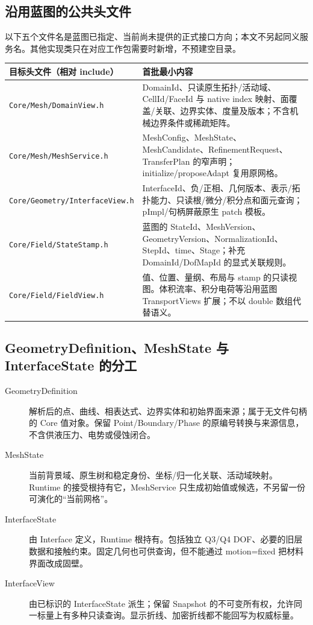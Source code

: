 \documentclass[UTF8,a4paper,11pt,fontset=fandol]{ctexart}
\newcommand{\code}[1]{\nolinkurl{#1}}
\begin{document}
\subsection{沿用蓝图的公共头文件}
以下五个文件名是蓝图已指定、当前尚未提供的正式接口方向；本文不另起同义服务名。其他实现类只在对应工作包需要时新增，不预建空目录。
\begin{longtable}{@{}P{.37\textwidth}P{.57\textwidth}@{}}
\toprule 目标头文件（相对 include） & 首批最小内容\\\midrule\endhead
\code{Core/Mesh/DomainView.h} & DomainId、只读原生拓扑/活动域、CellId/FaceId 与 native index 映射、面覆盖/关联、边界实体、度量及版本；不含机械边界条件或稀疏矩阵。\\
\code{Core/Mesh/MeshService.h} & MeshConfig、MeshState、MeshCandidate、RefinementRequest、TransferPlan 的窄声明；initialize/proposeAdapt 复用原网格。\\
\code{Core/Geometry/InterfaceView.h} & InterfaceId、负/正相、几何版本、表示/拓扑能力、只读根/微分/积分点和面元查询；pImpl/句柄屏蔽原生 patch 模板。\\
\code{Core/Field/StateStamp.h} & 蓝图的 StateId、MeshVersion、GeometryVersion、NormalizationId、StepId、time、Stage；补充 DomainId/DofMapId 的显式关联规则。\\
\code{Core/Field/FieldView.h} & 值、位置、量纲、布局与 stamp 的只读视图。体积流率、积分电荷等沿用蓝图 TransportViews 扩展；不以 double 数组代替语义。\\
\bottomrule
\end{longtable}

\subsection{GeometryDefinition、MeshState 与 InterfaceState 的分工}
\begin{description}
\item[GeometryDefinition] 解析后的点、曲线、相表达式、边界实体和初始界面来源；属于无文件句柄的 Core 值对象。保留 Point/Boundary/Phase 的原编号转换与来源信息，不含供液压力、电势或侵蚀闭合。
\item[MeshState] 当前背景域、原生树和稳定身份、坐标/归一化关联、活动域映射。Runtime 的接受根持有它，MeshService 只生成初始值或候选，不另留一份可演化的“当前网格”。
\item[InterfaceState] 由 Interface 定义，Runtime 根持有。包括独立 Q3/Q4 DOF、必要的旧层数据和接触约束。固定几何也可供查询，但不能通过 motion=fixed 把材料界面改成固壁。
\item[InterfaceView] 由已标识的 InterfaceState 派生；保留 Snapshot 的不可变所有权，允许同一标量上有多种只读查询。显示折线、加密折线都不能回写为权威标量。
\end{description}
\end{document}
